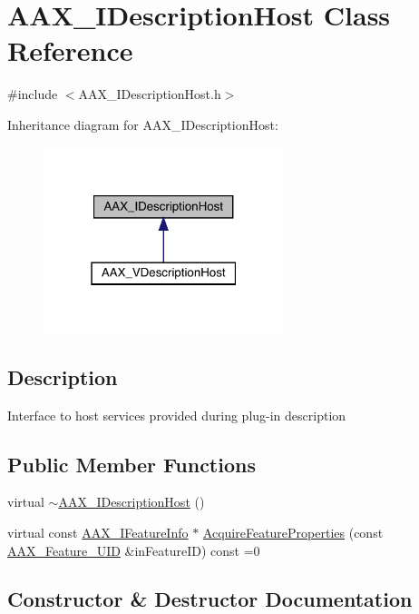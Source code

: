 \hypertarget{a01793}{}\section{A\+A\+X\+\_\+\+I\+Description\+Host Class Reference}
\label{a01793}


{\ttfamily \#include $<$A\+A\+X\+\_\+\+I\+Description\+Host.\+h$>$}



Inheritance diagram for A\+A\+X\+\_\+\+I\+Description\+Host\+:
\nopagebreak
\begin{figure}[H]
\begin{center}
\leavevmode
\includegraphics[width=199pt]{a01792}
\end{center}
\end{figure}


\subsection{Description}
Interface to host services provided during plug-\/in description \subsection*{Public Member Functions}
\begin{DoxyCompactItemize}
\item 
virtual \mbox{\hyperlink{a01793_a16245728ae5f26a67c2932f2e6a12f26}{$\sim$\+A\+A\+X\+\_\+\+I\+Description\+Host}} ()
\item 
virtual const \mbox{\hyperlink{a01829}{A\+A\+X\+\_\+\+I\+Feature\+Info}} $\ast$ \mbox{\hyperlink{a01793_aa0d9e27d0207113f98c217d870bfa5e9}{Acquire\+Feature\+Properties}} (const \mbox{\hyperlink{a00392_a53d6cf8a08224b3e813333e411ce798e}{A\+A\+X\+\_\+\+Feature\+\_\+\+U\+ID}} \&in\+Feature\+ID) const =0
\end{DoxyCompactItemize}


\subsection{Constructor \& Destructor Documentation}
\mbox{\label{a01793_a16245728ae5f26a67c2932f2e6a12f26}} 
